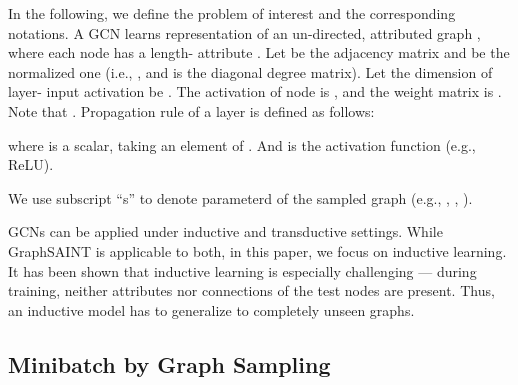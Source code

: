 \documentclass{article} \usepackage{iclr2020_conference,times}
\newcommand{\graphsaint}{{\fontfamily{lmtt}\selectfont GraphSAINT}}
\begin{document}
In the following, we define the problem of interest and the corresponding notations. 
A GCN learns representation of an un-directed, attributed graph , where each node  has a length- attribute .
Let  be the adjacency matrix and  be the normalized one (i.e., , and  is the diagonal degree matrix). 
Let the dimension of layer- input activation be . The activation of node  is , and the weight matrix is . Note that . 
Propagation rule of a layer is defined as follows:



where  is a scalar, taking an element of . And  is the activation function (e.g., ReLU). 

We use subscript ``s'' to denote parameterd of the sampled graph (e.g., , , ).

GCNs can be applied under inductive and transductive settings. While {\graphsaint} is applicable to both, in this paper, we focus on inductive learning. 
It has been shown that inductive learning is especially challenging \citep{graphsage} --- during training, neither attributes nor connections of the test nodes are present. Thus, an inductive model has to generalize to completely unseen graphs. 





\subsection{Minibatch by Graph Sampling\label{sec: gsaint}}
\end{document}
